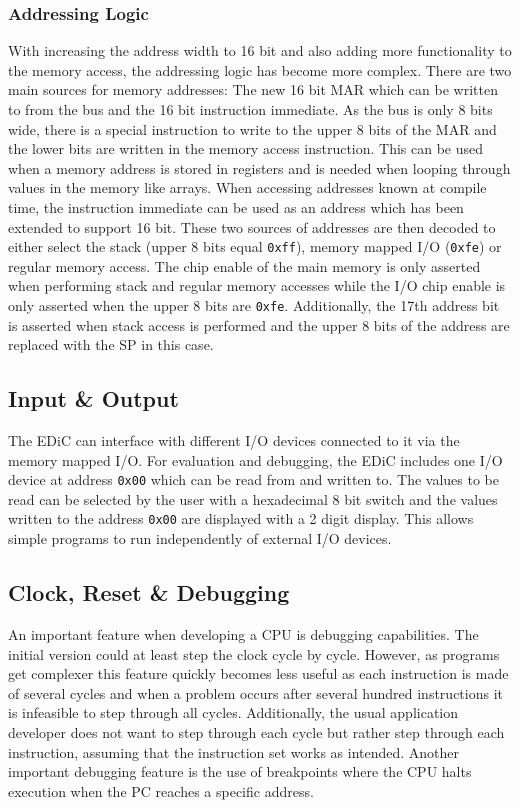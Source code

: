 \subsubsection{Addressing Logic}\label{sec:addrLogic}
With increasing the address width to 16 bit and also adding more functionality to the memory access, the addressing logic has become more complex.
There are two main sources for memory addresses: The new 16 bit \gls{MAR} which can be written to from the bus and the 16 bit instruction immediate.
As the bus is only 8 bits wide, there is a special instruction to write to the upper 8 bits of the \gls{MAR} and the lower bits are written in the memory access instruction.
This can be used when a memory address is stored in registers and is needed when looping through values in the memory like arrays.
When accessing addresses known at compile time, the instruction immediate can be used as an address which has been extended to support 16 bit.
These two sources of addresses are then decoded to either select the stack (upper 8 bits equal \texttt{0xff}), memory mapped I/O (\texttt{0xfe}) or regular memory access.
The chip enable of the main memory is only asserted when performing stack and regular memory accesses while the I/O chip enable is only asserted when the upper 8 bits are \texttt{0xfe}.
Additionally, the 17th address bit is asserted when stack access is performed and the upper 8 bits of the address are replaced with the \gls{SP} in this case.

\subsection{Input \& Output}\label{sec:IO}
The \gls{EDiC} can interface with different I/O devices connected to it via the memory mapped I/O.
For evaluation and debugging, the \gls{EDiC} includes one I/O device at address \texttt{0x00} which can be read from and written to.
The values to be read can be selected by the user with a hexadecimal 8 bit switch and the values written to the address \texttt{0x00} are displayed with a 2 digit display.
This allows simple programs to run independently of external I/O devices.

\subsection{Clock, Reset \& Debugging}\label{sec:clock}
An important feature when developing a \gls{CPU} is debugging capabilities.
The initial version could at least step the clock cycle by cycle.
However, as programs get complexer this feature quickly becomes less useful as each instruction is made of several cycles and when a problem occurs after several hundred instructions it is infeasible to step through all cycles.
Additionally, the usual application developer does not want to step through each cycle but rather step through each instruction, assuming that the instruction set works as intended.
Another important debugging feature is the use of breakpoints where the \gls{CPU} halts execution when the \gls{PC} reaches a specific address.

